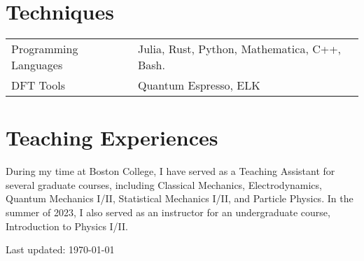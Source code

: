 \documentclass{article}
\begin{document}
\section*{Techniques}
    \begin{tabular}{ll}
        Programming Languages & Julia, Rust, Python, Mathematica, C++, Bash.\\
        DFT Tools & Quantum Espresso, ELK
    \end{tabular}


\section*{Teaching Experiences}
    During my time at Boston College, I have served as a Teaching Assistant for several graduate courses, including Classical Mechanics, Electrodynamics, Quantum Mechanics I/II, Statistical Mechanics I/II, and Particle Physics. In the summer of 2023, I also served as an instructor for an undergraduate course, Introduction to Physics I/II.



\begin{center}
  \begin{footnotesize}
    Last updated: \today 
  \end{footnotesize}
\end{center}
\end{document}
